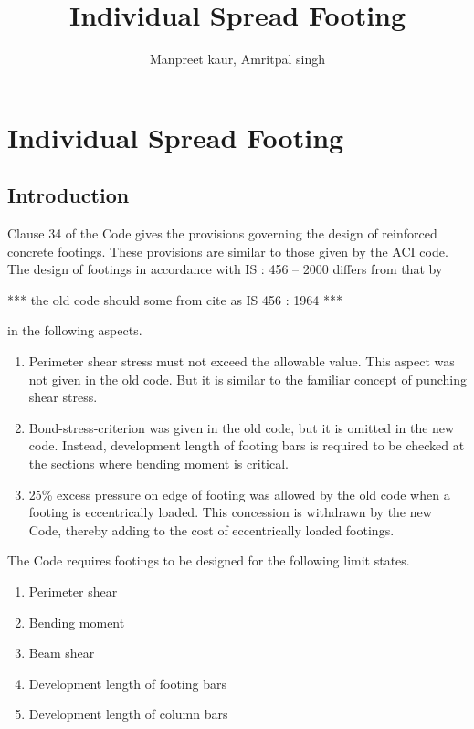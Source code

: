 \documentclass{report}
\title{Individual Spread Footing}
\author{Manpreet kaur, Amritpal singh}
\begin{document}
\maketitle
\tableofcontents
\setcounter {chapter}{11}
\chapter{Individual Spread Footing}
\section{Introduction} Clause 34 of the Code gives the provisions
governing the design of reinforced concrete footings.  These provisions are
similar to those given by the ACI code. The design of footings in
accordance with IS : 456 -- 2000 differs from that by

 ***  the old code  should some from cite as IS 456 : 1964 ***

in the
following aspects.
\begin{enumerate}

\item Perimeter shear stress must not exceed the allowable value. This
aspect was not given in the old code. But it is similar to the familiar
concept of punching shear stress.

\item Bond-stress-criterion was given in the old code, but it is omitted in
the new code. Instead, development length of footing bars is required to be
checked at the sections where bending moment is critical.

\item 25\% excess pressure on edge of footing was allowed by the old code
when a footing is eccentrically loaded. This concession is withdrawn by
the new Code, thereby adding to the cost of eccentrically loaded footings.
\end{enumerate}
The Code requires footings to be designed for the following limit states.

\begin{enumerate}
\item Perimeter shear
\item Bending moment
\item Beam shear
\item Development length of footing bars
\item Development length of column bars
\end{enumerate}
\end{document}

